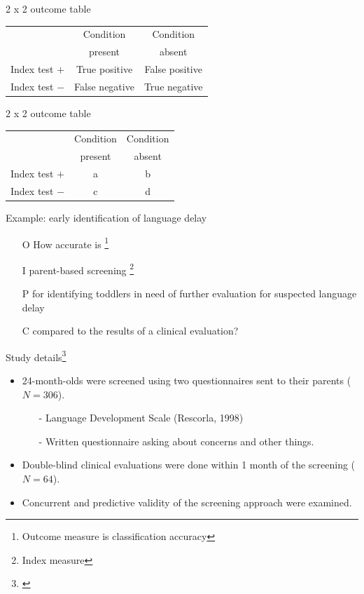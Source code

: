 \documentclass{beamer}
\begin{document}
\begin{frame}{2 x 2 outcome table}
\begin{center}
\begin{tabular}{l | c | c }
\toprule
& Condition & Condition \\
& present & absent \\ 
\hline
Index test $+$ & \alert{True positive} & False positive \\
\hline
Index test $-$ & False negative & \alert{True negative} \\
\bottomrule
\end{tabular}
\end{center}
\end{frame}

\begin{frame}{2 x 2 outcome table}
\begin{center}
\begin{tabular}{l | c | c }
\toprule
& Condition & Condition \\
& present & absent \\ 
\hline
Index test $+$ & a & b \\
\hline
Index test $-$ & c & d \\
\bottomrule
\end{tabular}
\end{center}
\end{frame}

\begin{frame}{Example: early identification of language delay}
	\begin{itemize}
	\item[O] How accurate is \footnote{\tiny{Outcome measure is classification accuracy}}
	\item[I]  parent-based screening \footnote{\tiny{Index measure}}
	\item[P] for identifying toddlers in need of further evaluation for suspected language delay
	\item[C] compared to the results of a clinical evaluation? 
	\end{itemize}
\end{frame}

\begin{frame}{Study details\footnote{\tiny{\citet{Klee2000a, Klee1998}}}}
	\begin{itemize}
	\item 24-month-olds were screened using two questionnaires sent to their parents ($N = 306$).
		\begin{itemize}
		\item[-] Language Development Scale (Rescorla, 1998)
		\item[-] Written questionnaire asking about concerns and other things. 
		\end{itemize}
	\item Double-blind clinical evaluations were done within 1 month of the screening ($N = 64$).
	\item Concurrent and predictive validity of the screening approach were examined. 
	\end{itemize}
\end{frame}
\end{document}
